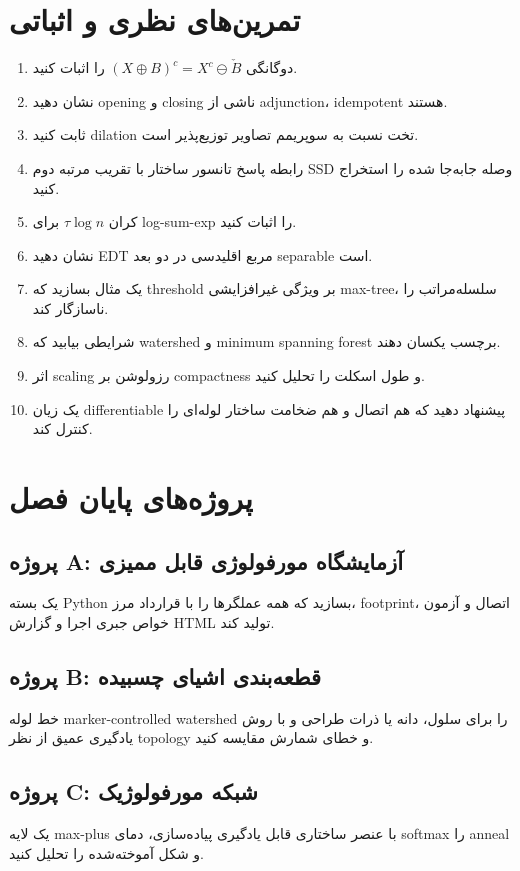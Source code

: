 \documentclass[12pt,openany,oneside]{book}
\begin{document}
\section{تمرین‌های نظری و اثباتی}
\begin{enumerate}
\item دوگانگی \((X\oplus B)^c=X^c\ominus\check B\) را اثبات کنید.
\item نشان دهید opening و closing ناشی از adjunction، idempotent هستند.
\item ثابت کنید dilation تخت نسبت به سوپریمم تصاویر توزیع‌پذیر است.
\item رابطه پاسخ تانسور ساختار با تقریب مرتبه دوم SSD وصله جابه‌جا شده را استخراج کنید.
\item کران \(\tau\log n\) برای log-sum-exp را اثبات کنید.
\item نشان دهید EDT مربع اقلیدسی در دو بعد separable است.
\item یک مثال بسازید که threshold بر ویژگی غیرافزایشی max-tree، سلسله‌مراتب را ناسازگار کند.
\item شرایطی بیابید که watershed و minimum spanning forest برچسب یکسان دهند.
\item اثر scaling رزولوشن بر compactness و طول اسکلت را تحلیل کنید.
\item یک زیان differentiable پیشنهاد دهید که هم اتصال و هم ضخامت ساختار لوله‌ای را کنترل کند.
\end{enumerate}

\section{پروژه‌های پایان فصل}
\subsection{پروژه A: آزمایشگاه مورفولوژی قابل ممیزی}
یک بسته Python بسازید که همه عملگرها را با قرارداد مرز، footprint، اتصال و آزمون خواص جبری اجرا و گزارش HTML تولید کند.

\subsection{پروژه B: قطعه‌بندی اشیای چسبیده}
خط لوله marker-controlled watershed را برای سلول، دانه یا ذرات طراحی و با روش یادگیری عمیق از نظر topology و خطای شمارش مقایسه کنید.

\subsection{پروژه C: شبکه مورفولوژیک}
یک لایه max-plus با عنصر ساختاری قابل یادگیری پیاده‌سازی، دمای softmax را anneal و شکل آموخته‌شده را تحلیل کنید.
\end{document}
